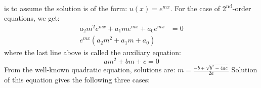  is to assume the solution is of the form: $u(x)=e^{mx}$. For the case of 2\textsuperscript{nd}-order equations, we get:
\begin{align*}
a_2m^2e^{mx}+a_1me^{mx}+a_0e^{mx}&=0 \\
e^{mx}\left(a_2m^2+a_1m+a_0\right)
\end{align*}
\noindent where the last line above is called the auxiliary equation: 
\begin{equation}
am^2+bm+c = 0
\label{eq:aux-eqn}
\end{equation}
From the well-known quadratic equation, solutions are: $m = \frac{-b\pm\sqrt{b^2-4ac}}{2a}$
Solution of this equation gives the following three cases:
